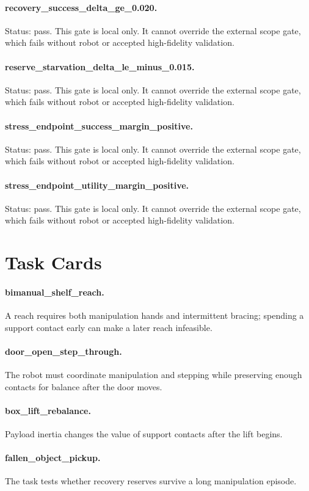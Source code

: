\documentclass{article}
\begin{document}
\paragraph{recovery\_success\_delta\_ge\_0.020.} Status: pass. This gate is local only. It cannot override the external scope gate, which fails without robot or accepted high-fidelity validation.
\paragraph{reserve\_starvation\_delta\_le\_minus\_0.015.} Status: pass. This gate is local only. It cannot override the external scope gate, which fails without robot or accepted high-fidelity validation.
\paragraph{stress\_endpoint\_success\_margin\_positive.} Status: pass. This gate is local only. It cannot override the external scope gate, which fails without robot or accepted high-fidelity validation.
\paragraph{stress\_endpoint\_utility\_margin\_positive.} Status: pass. This gate is local only. It cannot override the external scope gate, which fails without robot or accepted high-fidelity validation.
\clearpage
\section{Task Cards}
\paragraph{bimanual\_shelf\_reach.} A reach requires both manipulation hands and intermittent bracing; spending a support contact early can make a later reach infeasible.
\paragraph{door\_open\_step\_through.} The robot must coordinate manipulation and stepping while preserving enough contacts for balance after the door moves.
\paragraph{box\_lift\_rebalance.} Payload inertia changes the value of support contacts after the lift begins.
\paragraph{fallen\_object\_pickup.} The task tests whether recovery reserves survive a long manipulation episode.
\end{document}
